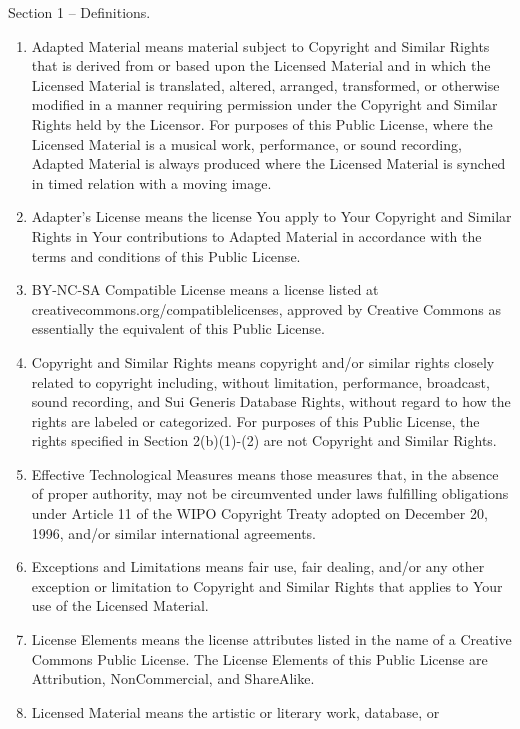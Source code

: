 \documentclass[
]{scrbook}
\begin{document}
Section 1 -- Definitions.

\begin{enumerate}
\def\labelenumi{\alph{enumi}.}
\item
  Adapted Material means material subject to Copyright and Similar
  Rights that is derived from or based upon the Licensed Material and in
  which the Licensed Material is translated, altered, arranged,
  transformed, or otherwise modified in a manner requiring permission
  under the Copyright and Similar Rights held by the Licensor. For
  purposes of this Public License, where the Licensed Material is a
  musical work, performance, or sound recording, Adapted Material is
  always produced where the Licensed Material is synched in timed
  relation with a moving image.
\item
  Adapter's License means the license You apply to Your Copyright and
  Similar Rights in Your contributions to Adapted Material in accordance
  with the terms and conditions of this Public License.
\item
  BY-NC-SA Compatible License means a license listed at
  creativecommons.org/compatiblelicenses, approved by Creative Commons
  as essentially the equivalent of this Public License.
\item
  Copyright and Similar Rights means copyright and/or similar rights
  closely related to copyright including, without limitation,
  performance, broadcast, sound recording, and Sui Generis Database
  Rights, without regard to how the rights are labeled or categorized.
  For purposes of this Public License, the rights specified in Section
  2(b)(1)-(2) are not Copyright and Similar Rights.
\item
  Effective Technological Measures means those measures that, in the
  absence of proper authority, may not be circumvented under laws
  fulfilling obligations under Article 11 of the WIPO Copyright Treaty
  adopted on December 20, 1996, and/or similar international agreements.
\item
  Exceptions and Limitations means fair use, fair dealing, and/or any
  other exception or limitation to Copyright and Similar Rights that
  applies to Your use of the Licensed Material.
\item
  License Elements means the license attributes listed in the name of a
  Creative Commons Public License. The License Elements of this Public
  License are Attribution, NonCommercial, and ShareAlike.
\item
  Licensed Material means the artistic or literary work, database, or

\end{enumerate}
\end{document}
